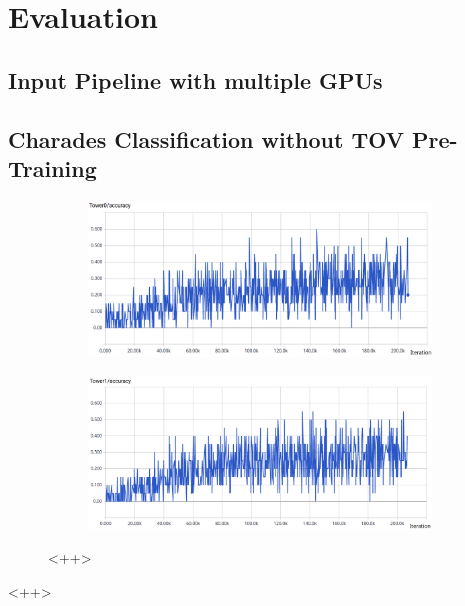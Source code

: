 \section{Evaluation}

\subsection{Input Pipeline with multiple GPUs}

\subsection{Charades Classification without TOV Pre-Training}

\begin{figure}[H]
    \begin{subfigure}[c]{\textwidth}
    \centering
    \includegraphics[width=\textwidth]{img_evaluation/tower0accuracy}
    \end{subfigure}
    \begin{subfigure}[c]{\textwidth}
    \includegraphics[width=\textwidth]{img_evaluation/tower1accuracy}
    \end{subfigure}<++>
\label{fig:<+label+>}
\end{figure}<++>

